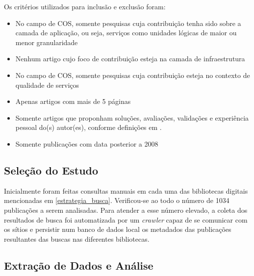 Os critérios utilizados para inclusão e exclusão foram:

\begin{itemize}
\item No campo de COS, somente pesquisas cuja contribuição tenha sido sobre a camada de aplicação, ou seja, serviços como unidades 
lógicas de maior ou menor granularidade
\item Nenhum artigo cujo foco de contribuição esteja na camada de infraestrutura
\item No campo de COS, somente pesquisas cuja contribuição esteja no contexto de qualidade de serviços
\item Apenas artigos com mais de 5 páginas
\item Somente artigos que proponham soluções, avaliações, validações e experiência pessoal do(s) autor(es), conforme definições em \cite{Barbara Kitchenham}.
\item Somente publicações com data posterior a 2008
\end{itemize}

\subsection{Seleção do Estudo}

Inicialmente foram feitas consultas manuais em cada uma das bibliotecas digitais mencionadas em \ref{estrategia_busca}. Verificou-se ao todo o número de 1034 publicações a serem analisadas. Para atender a esse número elevado, a coleta dos resultados de busca foi automatizada por um \emph{crawler} capaz de se comunicar com os sítios e persistir num banco de dados local os metadados das publicações resultantes das buscas nas diferentes bibliotecas.

\subsection{Extração de Dados e Análise}


